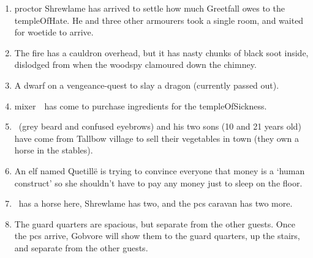 \documentclass[10pt,twoside]{book}
\begin{document}
\begin{enumerate}\itemsep0em\setcounter{enumi}{\value{diceNo}}
  \item
  \Gls{proctor} Shrewlame has arrived to settle how much Greetfall owes to the \gls{templeOfHate}.
  \label{lt:proctor}
  He and three other \glspl{armourer} took a single room, and waited for \gls{woetide} to arrive.
  \item
  The fire has a cauldron overhead, but it has nasty chunks of black soot inside, dislodged from when the \gls{woodspy} clamoured down the chimney.
  \label{lt:fire}
  \item
  A dwarf on a vengeance-quest to slay a dragon (currently passed out).
  \label{lt:dwarf}
  \item
  \Gls{mixer}~\composeHumanName\ has come to purchase \glspl{ingredient} for the \gls{templeOfSickness}.
  \label{lt:mixer}
  \item
  \composeHumanName\ (grey beard and confused eyebrows) and his two sons (10 and 21 years old) have come from Tallbow \gls{village} to sell their vegetables in town (they own a horse in the stables).
  \label{lt:farmer}
  \item
  An elf named Quetill\"e is trying to convince everyone that money is a `human construct' so she shouldn't have to pay any money just to sleep on the floor.
  \label{lt:elf}

  \item
  \currentName\ has a horse here, Shrewlame has two, and the \glspl{pc} caravan has two more.
  \label{lt:stables}
  \item
  The \gls{guard} quarters are spacious, but separate from the other guests.
  Once the \glspl{pc} arrive, Gobvore will show them to the \gls{guard} quarters, up the stairs, and separate from the other guests.
  \label{lt:guard}
\end{enumerate}

\end{document}
